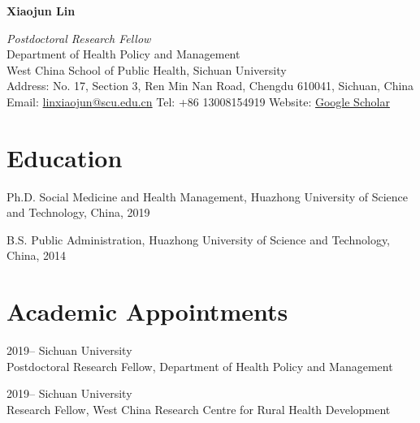 \documentclass[12pt,letterpaper]{report}
\newcommand{\myname}{Xiaojun Lin}
\newcommand{\namefont}[1]{{\normalfont\bfseries\Huge{#1}}}
\begin{document}
    \raggedright

    \namefont{\myname}

    \vspace{1em}
    \begin{minipage}[t]{\textwidth}
    	\textit{Postdoctoral Research Fellow}  \\
        Department of Health Policy and Management \\
        West China School of Public Health, Sichuan University \\
        Address: No. 17, Section 3, Ren Min Nan Road, Chengdu 610041, Sichuan, China \\
        Email: \href{mailto:linxiaojun@scu.edu.cn}{linxiaojun@scu.edu.cn}  \space      Tel: +86 13008154919  \space  Website: \href{https://scholar.google.com/citations?user=ZBGYTowAAAAJ&hl=en}{Google Scholar}
    \end{minipage}
    \vspace{0.5em}


    \section*{Education}

    \begin{tablist}
    
        \item[Ph.D.] \tab Social Medicine and Health Management, Huazhong University of Science and Technology, China, 2019

        \item[B.S.]  \tab Public Administration,  Huazhong University of Science and Technology, China, 2014
        
    \end{tablist}


    \section*{Academic Appointments}

    \begin{tablist}

        \item[2019--]   \tab Sichuan University \\
                             Postdoctoral Research Fellow, Department of Health Policy and Management\\
                       
        \item[2019--]   \tab Sichuan University \\
         					 Research Fellow, West China Research Centre for Rural Health Development         

    \end{tablist}
\end{document}
